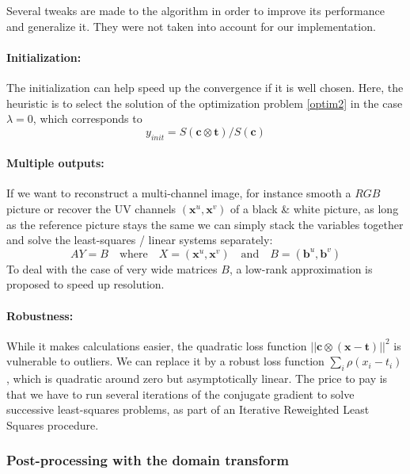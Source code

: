 \documentclass{article}
\begin{document}
Several tweaks are made to the algorithm in order to improve its performance and generalize it. They were not taken into account for our implementation.

\paragraph{Initialization:} The initialization can help speed up the convergence if it is well chosen. Here, the heuristic is to select the solution of the optimization problem \eqref{optim2} in the case $\lambda = 0$, which corresponds to
\begin{equation}
    y_{init} = S(\textbf{c} \otimes \textbf{t}) / S(\textbf{c})
\end{equation}

\paragraph{Multiple outputs:} If we want to reconstruct a multi-channel image, for instance smooth a $RGB$ picture or recover the UV channels $(\textbf{x}^u, \textbf{x}^v)$ of a black \& white picture, as long as the reference picture stays the same we can simply stack the variables together and solve the least-squares / linear systems separately:
\begin{equation}
    A Y = B \quad \text{where} \quad X = (\textbf{x}^u, \textbf{x}^v) \quad \text{and} \quad B = (\textbf{b}^u, \textbf{b}^v)
\end{equation}
To deal with the case of very wide matrices $B$, a low-rank approximation is proposed to speed up resolution.

\paragraph{Robustness:} While it makes calculations easier, the quadratic loss function $||\textbf{c} \otimes (\textbf{x} - \textbf{t})||^2$ is vulnerable to outliers. We can replace it by a robust loss function $\sum_{i}\rho(x_i - t_i)$, which is quadratic around zero but asymptotically linear. The price to pay is that we have to run several iterations of the conjugate gradient to solve successive least-squares problems, as part of an Iterative Reweighted Least Squares procedure.

\subsubsection{Post-processing with the domain transform}
\end{document}
